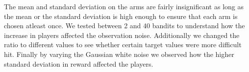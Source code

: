 The mean and standard deviation on the arms are fairly insignificant as long as the mean or the standard deviation
is high enough to ensure that each arm is chosen atleast once. We tested between 2 and 40 bandits to understand how
the increase in players affected the observation noise. Additionally we changed the ratio to different values
to see whether certain target values were more difficult hit. Finally by varying the Gaussian white noise we observed how
the higher standard deviation in reward affected the players.




% 
% 
% 
% 
% 
% 
% 
% 
% 
% 
% 
